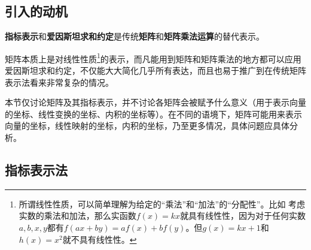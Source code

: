 
\begin{issues}
\end{issues}





\subsection{引入的动机}


\textbf{指标表示}和\textbf{爱因斯坦求和约定}是传统\textbf{矩阵}和\textbf{矩阵乘法运算}的替代表示。

矩阵本质上是对线性性质\footnote{所谓线性性质，可以简单理解为给定的“乘法”和“加法”的“分配性”。比如
考虑实数的乘法和加法，那么实函数$f(x)=kx$就具有线性性，因为对于任何实数$a, b, x, y$都有$f(ax+by)=af(x)+bf(y)$。但$g(x)=kx+1$和$h(x)=x^2$就不具有线性性。}的表示，而凡能用到矩阵和矩阵乘法的地方都可以应用爱因斯坦求和约定，不仅能大大简化几乎所有表达，而且也易于推广到在传统矩阵表示法看来非常复杂的情况。

本节仅讨论矩阵及其指标表示，并不讨论各矩阵会被赋予什么意义（用于表示向量的坐标、线性变换的坐标、内积的坐标等）。在不同的语境下，矩阵可能用来表示向量的坐标，线性映射的坐标，内积的坐标，乃至更多情况，具体问题应具体分析。





\subsection{指标表示法}


